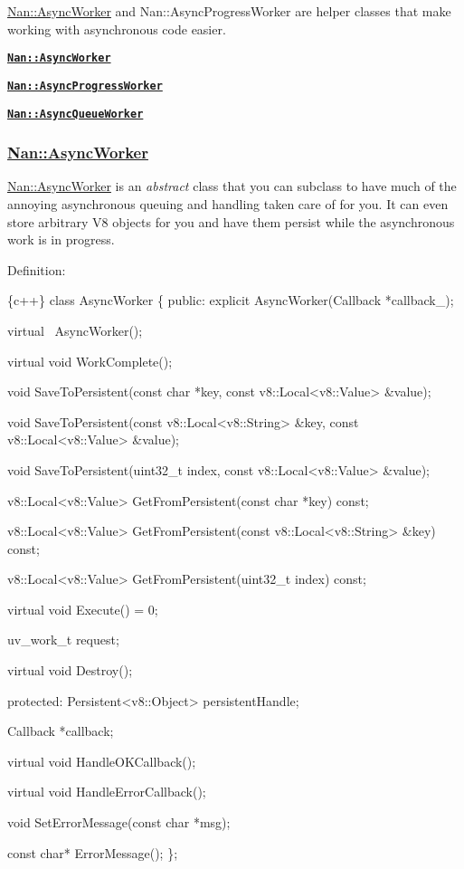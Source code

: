 {\ttfamily \hyperlink{class_nan_1_1_async_worker}{Nan\+::\+Async\+Worker}} and {\ttfamily Nan\+::\+Async\+Progress\+Worker} are helper classes that make working with asynchronous code easier.


\begin{DoxyItemize}
\item \href{#api_nan_async_worker}{\tt {\bfseries {\ttfamily Nan\+::\+Async\+Worker}}}
\item \href{#api_nan_async_progress_worker}{\tt {\bfseries {\ttfamily Nan\+::\+Async\+Progress\+Worker}}}
\item \href{#api_nan_async_queue_worker}{\tt {\bfseries {\ttfamily Nan\+::\+Async\+Queue\+Worker}}}
\end{DoxyItemize}

\label{_api_nan_async_worker}%
 \subsubsection*{\hyperlink{class_nan_1_1_async_worker}{Nan\+::\+Async\+Worker}}

{\ttfamily \hyperlink{class_nan_1_1_async_worker}{Nan\+::\+Async\+Worker}} is an {\itshape abstract} class that you can subclass to have much of the annoying asynchronous queuing and handling taken care of for you. It can even store arbitrary V8 objects for you and have them persist while the asynchronous work is in progress.

Definition\+:


\begin{DoxyCode}
\{c++\}
class AsyncWorker \{
 public:
  explicit AsyncWorker(Callback *callback\_);

  virtual ~AsyncWorker();

  virtual void WorkComplete();

  void SaveToPersistent(const char *key, const v8::Local<v8::Value> &value);

  void SaveToPersistent(const v8::Local<v8::String> &key,
                        const v8::Local<v8::Value> &value);

  void SaveToPersistent(uint32\_t index,
                        const v8::Local<v8::Value> &value);

  v8::Local<v8::Value> GetFromPersistent(const char *key) const;

  v8::Local<v8::Value> GetFromPersistent(const v8::Local<v8::String> &key) const;

  v8::Local<v8::Value> GetFromPersistent(uint32\_t index) const;

  virtual void Execute() = 0;

  uv\_work\_t request;

  virtual void Destroy();

 protected:
  Persistent<v8::Object> persistentHandle;

  Callback *callback;

  virtual void HandleOKCallback();

  virtual void HandleErrorCallback();

  void SetErrorMessage(const char *msg);

  const char* ErrorMessage();
\};
\end{DoxyCode}


